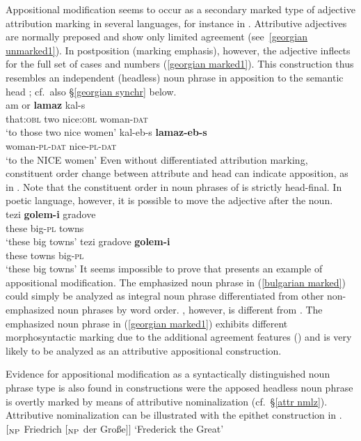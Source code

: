 Appositional modification seems to occur as a secondary marked type of adjective attribution marking in several languages, for instance in . Attributive adjectives are normally preposed and show only limited agreement (see~\ref{georgian unmarked1}). In postposition (marking emphasis), however, the adjective inflects for the full set of cases and numbers (\ref{georgian marked1}). This construction thus resembles an independent (headless) noun phrase in apposition to the semantic head \parencite[652, 677]{testelec1998}; cf.~also \S\ref{georgian synchr} below.
\ea
{}\\
\ea \label{georgian unmarked1}
\gll	am or \textbf{lamaz} kal-s\\
	that:\textsc{obl} two nice:\textsc{obl} woman-\textsc{dat}\\
\glt	‘to those two nice women’
\ex \label{georgian marked1}
\gll	kal-eb-s \textbf{lamaz-eb-s}\\
	woman-\textsc{pl}-\textsc{dat} nice-\textsc{pl}-\textsc{dat}\\
\glt	‘to the NICE women’
\z
\z
Even without differentiated attribution marking, constituent order change between attribute and head can indicate apposition, as in . Note that the constituent order in noun phrases of  is strictly head-final. In poetic language, however, it is possible to move the adjective after the noun.
\ea
{}\\
\ea
\gll	tezi \textbf{golem-i} gradove\\
	these big-\textsc{pl} towns\\
\glt	‘these big towns’
\ex	\label{bulgarian marked}
\gll	tezi gradove \textbf{golem-i}\\
	these towns big-\textsc{pl}\\
\glt	‘these big towns’
\z
\z
It seems impossible to prove that  presents an example of appositional modification. The emphasized noun phrase in (\ref{bulgarian marked}) could simply be analyzed as integral noun phrase differentiated from other non-emphasized noun phrases by word order. , however, is different from . The emphasized noun phrase in (\ref{georgian marked1}) exhibits different morphosyntactic marking due to the additional agreement features () and is very likely to be analyzed as an attributive appositional construction. 

Evidence for appositional modification as a syntactically distinguished noun phrase type is also found in constructions were the apposed headless noun phrase is overtly marked by means of attributive nominalization (cf.~\S\ref{attr nmlz}). Attributive nominalization can be illustrated with the epithet construction in .
\ea 
{}\\
$[_{\rm NP}$ Friedrich $[_{\rm NP}$ der Gro{ß}e$] ]$ \rm{‘Frederick the Great’}
\z

%